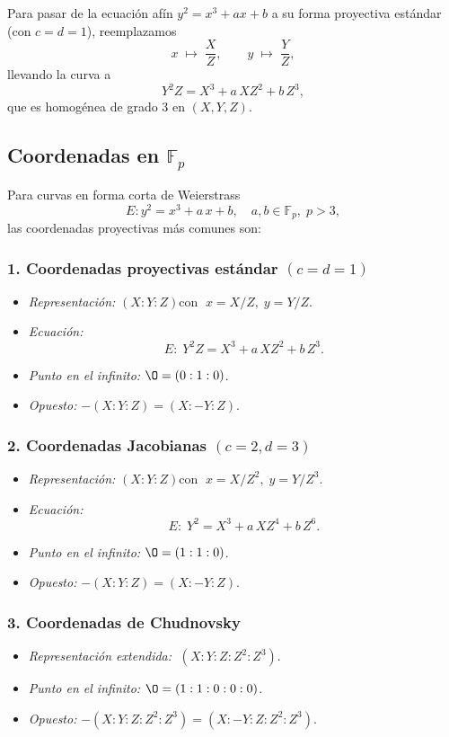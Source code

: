 Para pasar de la ecuación afín \(y^2 = x^3 + ax + b\) a su forma proyectiva estándar (con \(c=d=1\)), reemplazamos
\[
  x\;\mapsto\;\frac{X}{Z},\qquad y\;\mapsto\;\frac{Y}{Z},
\]
llevando la curva a
\[
  Y^2Z = X^3 + a\,X Z^2 + b\,Z^3,
\]
que es homogénea de grado 3 en \((X,Y,Z)\).

\subsection{Coordenadas en \(\mathbb{F}_p\)}\label{sec:proj_Fp}
Para curvas en forma corta de Weierstrass
\[
  E\colon y^2 = x^3 + a\,x + b,\quad a,b\in\mathbb{F}_p,\;p>3,
\]
las coordenadas proyectivas más comunes son:
\subsubsection*{1. Coordenadas proyectivas estándar \((c=d=1)\)}
\begin{itemize}
  \item \emph{Representación:} \((X:Y:Z)\)\quad con \(\;x = X/Z,\;y = Y/Z\).
  \item \emph{Ecuación:}
    \[
      E\colon\;Y^2Z = X^3 + a\,X Z^2 + b\,Z^3.
    \]
  \item \emph{Punto en el infinito:} \(\O = (0:1:0)\).
  \item \emph{Opuesto:} \(- (X:Y:Z) = (X:-Y:Z)\).
\end{itemize}

\subsubsection*{2. Coordenadas Jacobianas \((c=2,d=3)\)}
\begin{itemize}
  \item \emph{Representación:} \((X:Y:Z)\)\quad con \(\;x = X/Z^2,\;y = Y/Z^3\).
  \item \emph{Ecuación:}
    \[
      E\colon\;Y^2 = X^3 + a\,X Z^4 + b\,Z^6.
    \]
  \item \emph{Punto en el infinito:} \(\O = (1:1:0)\).
  \item \emph{Opuesto:} \(- (X:Y:Z) = (X:-Y:Z)\).
\end{itemize}

\subsubsection*{3. Coordenadas de Chudnovsky}
\begin{itemize}
  \item \emph{Representación extendida:} \(\;(X:Y:Z:Z^2:Z^3)\).  
  \item \emph{Punto en el infinito:} \(\O=(1:1:0:0:0)\).
  \item \emph{Opuesto:} \(- (X:Y:Z:Z^2:Z^3) = (X:-Y:Z:Z^2:Z^3)\).
\end{itemize}

